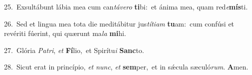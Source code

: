 {\numbfont\textcolor{\numbcolor}{25.}}~Exsultábunt lábia mea cum can\-\textit{tá}\-\textit{ve}\textit{ro} \textbf{ti}\-bi:~\star et ánima mea, quam red\-\textit{e}\-\textbf{mís}ti.\par
{\numbfont\textcolor{\numbcolor}{26.}}~Sed et lingua mea tota die meditábitur jus\-\textit{tí}\-\textit{ti}\textit{am} \textbf{tu}\-am:~\star cum confúsi et revériti fúerint, qui quærunt ma\textit{la} \textbf{mi}\-hi.\par
{\numbfont\textcolor{\numbcolor}{27.}}~Glória \textit{Pa}\-\textit{tri}, \textit{et} \textbf{Fí}\-lio,~\star et Spirítu\textit{i} \textbf{Sanc}\-to.\par
{\numbfont\textcolor{\numbcolor}{28.}}~Sicut erat in princípio, \textit{et} \textit{nunc}\-, \textit{et} \textbf{sem}\-per,~\star et in sǽcula sæculó\-\textit{rum}\-. \textbf{A}\-men.\par
